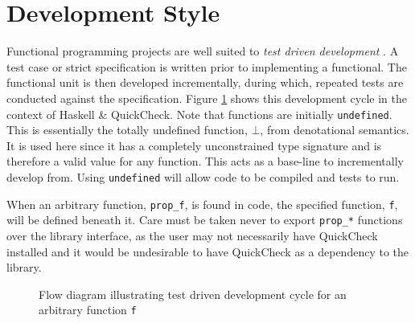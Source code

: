 \section{Development Style}
Functional programming projects are well suited to \textit{test driven development} \cite{beck03}. A test case or strict specification is written prior to implementing a functional. The functional unit is then developed incrementally, during which, repeated tests are conducted against the specification. Figure \ref{fig:tdd} shows this development cycle in the context of {Haskell} \& {QuickCheck}. Note that functions are initially \texttt{undefined}. This is essentially the totally undefined function, $\bot$, from denotational semantics. It is used here since it has a completely unconstrained type signature and is therefore a valid value for any function. This acts as a base-line to incrementally develop from. Using \texttt{undefined} will allow code to be compiled and tests to run.

When an arbitrary function, \verb|prop_f|, is found in code, the specified function, \verb|f|, will be defined beneath it. Care must be taken never to export \verb|prop_*| functions over the library interface, as the user may not necessarily have {QuickCheck} installed and it would be undesirable to have {QuickCheck} as a dependency to the library.

\begin{figure}[]
\centering
\scalebox{1}

\caption{Flow diagram illustrating {test driven development} cycle for an arbitrary function \texttt{f}\label{fig:tdd}}
\end{figure}